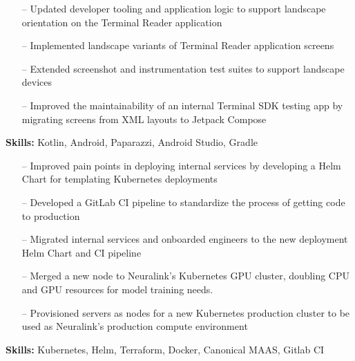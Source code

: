 \documentclass[9pt,a4paper]{altacv}
\begin{document}
\tagline{}

\begin{fullwidth}
    \makecvheader
\end{fullwidth}






\begin{itemize}
    \setlength{\itemindent}{0.5em}
    \item[--] Updated developer tooling and application logic to support landscape orientation on the Terminal Reader application
    \item[--] Implemented landscape variants of Terminal Reader application screens
    \item[--] Extended screenshot and instrumentation test suites to support landscape devices
    \item[--] Improved the maintainability of an internal Terminal SDK testing app by migrating screens from XML layouts to Jetpack Compose
\end{itemize}
\smallskip
\textbf{Skills:} Kotlin, Android, Paparazzi, Android Studio, Gradle

\divider


\begin{itemize}
    \setlength{\itemindent}{0.5em}
    \item[--] Improved pain points in deploying internal services by developing a Helm Chart for templating Kubernetes deployments
    \item[--] Developed a GitLab CI pipeline to standardize the process of getting code to production
    \item[--] Migrated internal services and onboarded engineers to the new deployment Helm Chart and CI pipeline
    \item[--] Merged a new node to Neuralink's Kubernetes GPU cluster, doubling CPU and GPU resources for model training needs.
    \item[--] Provisioned servers as nodes for a new Kubernetes production cluster to be used as Neuralink's production compute environment
\end{itemize}
\smallskip
\textbf{Skills:} Kubernetes, Helm, Terraform, Docker, Canonical MAAS, Gitlab CI
\end{document}
